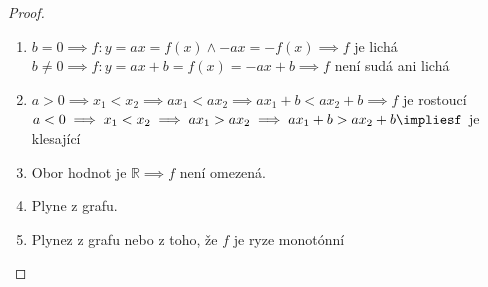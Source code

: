 \begin{proof}
  \begin{enumerate}[1.]
    \item $b=0 \implies f:y= ax = f(x) \land -ax = -f(x) \implies f$ je lichá\\
          $b\neq 0 \implies f:y = ax + b = f(x) = -ax + b \implies f$ není sudá ani lichá
    \item $a>0 \implies x_1 < x_2 \implies ax_1 < ax_2 \implies ax_1 + b < ax_2 + b \implies f$ je rostoucí\\
          $a<0 \implies x_1 < x_2 \implies ax_1 > ax_2 \implies ax_1 + b > ax_2 + b \impliesf$ je klesající
    \item Obor hodnot je $\mathbb R \implies f$ není omezená.
    \item Plyne z grafu.
    \item Plynez z grafu nebo z toho, že $f$ je ryze monotónní
  \end{enumerate}
\end{proof}
